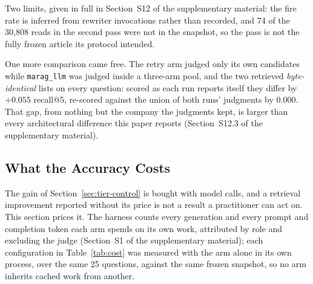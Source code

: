 \documentclass[acmsmall,review,anonymous,screen]{acmart}
\begin{document}
Two limits, given in full in Section~S12 of the supplementary material: the fire
rate is inferred from rewriter invocations rather than recorded, and 74 of the
30{,}808 reads in the second pass were not in the snapshot, so the pass is not
the fully frozen article its protocol intended.

One more comparison came free. The retry arm judged only its own candidates while
\texttt{marag\_llm} was judged inside a three-arm pool, and the two retrieved
\emph{byte-identical} lists on every question: scored as each run reports itself
they differ by $+0.055$ recall@5, re-scored against the union of both runs'
judgments by $0.000$. That gap, from nothing but the company the judgments kept,
is larger than every architectural difference this paper reports (Section~S12.3
of the supplementary material).

\subsection{What the Accuracy Costs}\label{sec:efficiency}

The gain of Section~\ref{sec:tier-control} is bought with model calls, and a
retrieval improvement reported without its price is not a result a practitioner
can act on. This section prices it. The harness counts every generation and
every prompt and completion token each arm spends on its own work, attributed
by role and excluding the judge (Section~S1 of the supplementary material); each
configuration in Table~\ref{tab:cost} was measured with the arm alone in its own
process, over the same 25 questions, against the same frozen snapshot, so no arm
inherits cached work from another.
\end{document}
